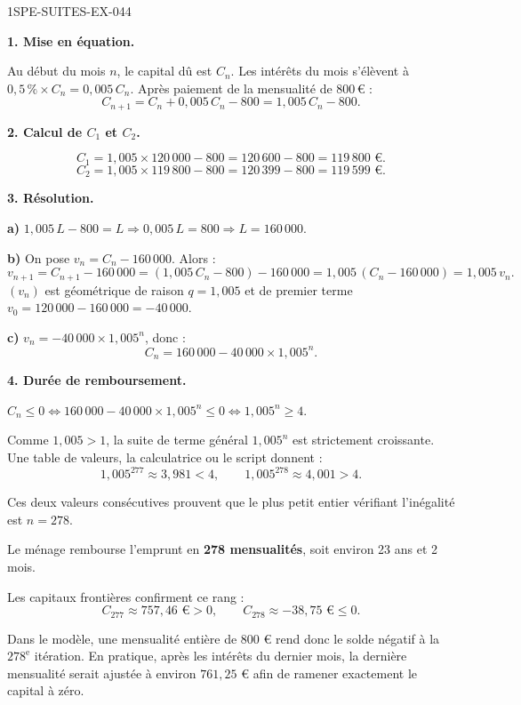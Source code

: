 \begin{corrige}{1SPE-SUITES-EX-044}

\textbf{1. Mise en équation.}

Au début du mois $n$, le capital dû est $C_n$. Les intérêts du mois s'élèvent à $0{,}5\,\% \times C_n = 0{,}005\,C_n$. Après paiement de la mensualité de $800$\,€ :
\[
C_{n+1} = C_n + 0{,}005\,C_n - 800 = 1{,}005\,C_n - 800.
\]

\textbf{2. Calcul de $C_1$ et $C_2$.}

\[
C_1 = 1{,}005 \times 120\,000 - 800 = 120\,600 - 800 = 119\,800 \text{ €}.
\]
\[
C_2 = 1{,}005 \times 119\,800 - 800 = 120\,399 - 800 = 119\,599 \text{ €}.
\]

\textbf{3. Résolution.}


\textbf{a)} $1{,}005\,L - 800 = L \Rightarrow 0{,}005\,L = 800 \Rightarrow L = 160\,000$.

\textbf{b)} On pose $v_n = C_n - 160\,000$. Alors :
\[
v_{n+1} = C_{n+1} - 160\,000 = (1{,}005\,C_n - 800) - 160\,000 = 1{,}005\,(C_n - 160\,000) = 1{,}005\,v_n.
\]
$(v_n)$ est géométrique de raison $q = 1{,}005$ et de premier terme $v_0 = 120\,000 - 160\,000 = -40\,000$.

\textbf{c)} $v_n = -40\,000 \times 1{,}005^n$, donc :
\[
\boxed{C_n = 160\,000 - 40\,000 \times 1{,}005^n}.
\]

\textbf{4. Durée de remboursement.}


$C_n \leq 0 \Leftrightarrow 160\,000 - 40\,000 \times 1{,}005^n \leq 0 \Leftrightarrow 1{,}005^n \geq 4$.

Comme $1{,}005>1$, la suite de terme général $1{,}005^n$ est strictement croissante. Une table de valeurs, la calculatrice ou le script donnent :
\[
1{,}005^{277}\approx3{,}981<4,
\qquad
1{,}005^{278}\approx4{,}001>4.
\]

Ces deux valeurs consécutives prouvent que le plus petit entier vérifiant l'inégalité est $n=278$.

Le ménage rembourse l'emprunt en \textbf{278 mensualités}, soit environ 23 ans et 2 mois.

Les capitaux frontières confirment ce rang :
\[
C_{277}\approx757{,}46\text{ €}>0,
\qquad
C_{278}\approx-38{,}75\text{ €}\leq0.
\]

Dans le modèle, une mensualité entière de $800$ € rend donc le solde négatif à la $278^\text{e}$ itération. En pratique, après les intérêts du dernier mois, la dernière mensualité serait ajustée à environ $761{,}25$ € afin de ramener exactement le capital à zéro.


\end{corrige}
